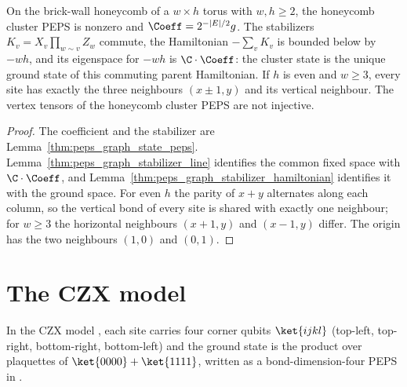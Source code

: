 \begin{lemma}
    \label{thm:peps_honeycomb_cluster_state}
    \leanok
    On the brick-wall honeycomb of a $w\times h$ torus with $w,h\geq2$, the
    honeycomb cluster PEPS is nonzero and $\Coeff=2^{-|E|/2}g$. The
    stabilizers $K_v=X_v\prod_{w\sim v}Z_w$ commute, the Hamiltonian
    $-\sum_vK_v$ is bounded below by $-wh$, and its eigenspace for $-wh$ is
    $\C\cdot\Coeff$: the cluster state is the unique ground state of this
    commuting parent Hamiltonian. If $h$ is even and $w\geq3$, every site has
    exactly the three neighbours $(x\pm1,y)$ and its vertical neighbour. The
    vertex tensors of the honeycomb cluster PEPS are not injective.
\end{lemma}

\begin{proof}\leanok
    The coefficient and the stabilizer are Lemma~\ref{thm:peps_graph_state_peps}.
    Lemma~\ref{thm:peps_graph_stabilizer_line} identifies the common fixed
    space with $\C\cdot\Coeff$, and
    Lemma~\ref{thm:peps_graph_stabilizer_hamiltonian} identifies it with the
    ground space. For even $h$ the parity of $x+y$ alternates along each
    column, so the vertical bond of every site is shared with exactly one
    neighbour; for $w\geq3$ the horizontal neighbours $(x+1,y)$ and
    $(x-1,y)$ differ. The origin has the two neighbours $(1,0)$ and $(0,1)$.
\end{proof}

\section{The CZX model}%
\label{sec:peps_czx}

In the CZX model \cite{ChenLiuWen2011CZX}, each site carries four corner qubits
$\ket{ijkl}$ (top-left, top-right, bottom-right, bottom-left) and the ground
state is the product over plaquettes of $\ket{0000}+\ket{1111}$, written as a
bond-dimension-four PEPS in \cite[Appendix~A, ``The CZX model'']{Cirac2021Matrix}.

